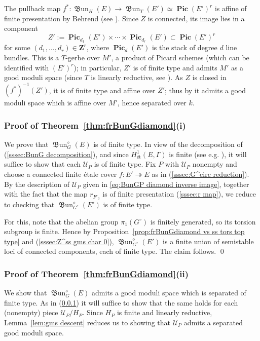 \documentclass[12pt, oneside]{amsart}
\numberwithin{equation}{section}
\theoremstyle{remark}
\theoremstyle{plain}
\newcommand{\bZ}{\mathbf{Z}}
\newcommand{\UU}{\mathcal{U}}
\newcommand{\PIC}{\operatorname{\mathbf{Pic}}}
\newcommand{\frBun}{\operatorname{\mathfrak{B}un}}
\begin{document}
The pullback map $f^*:\frBun_H(E)\to\frBun_T(E') \simeq \PIC(E')^{r}$ is affine of finite presentation by Behrend (see \cite[Lem.~3.12]{ORT}).
Since $Z$ is connected, its image lies in a component $$Z' := \PIC_{d_1}(E') \times \cdots \times \PIC_{d_r}(E') \subset \PIC(E')^{r}$$ for some $(d_1,\ldots,d_r) \in \bZ^{r}$, where $\PIC_d(E')$ is the stack of degree $d$ line bundles.
This is a $T$-gerbe over $M'$, a product of Picard schemes (which can be identified with $(E')^{r}$); in particular, $Z'$ is of finite type and admits $M'$ as a good moduli space (since $T$ is linearly reductive, see \cite[Prop.~4.7(ii)]{Alper}).
As $Z$ is closed in $(f^*)^{-1}(Z')$, it is of finite type and affine over $Z'$; thus by \cite[Lem.~4.14]{Alper} it admits a good moduli space which is affine over $M'$, hence separated over $k$.

\subsubsection{Proof of Theorem~\ref{thm:frBunGdiamond}(i)}\label{sssec:proof frBunGdiamond i}

We prove that $\frBun_G^\diamond(E)$ is of finite type.
In view of the decomposition of (\ref{sssec:BunG decomposition}), and since $H^1_{\text{\'et}}(E,\Gamma)$ is finite (see e.g. \cite[Prop.~3.1]{ORT}), it will suffice to show that each $\UU_P$ is of finite type.
Fix $P$ with $\UU_P$ nonempty and choose a connected finite \'etale cover $f : E' \twoheadrightarrow E$ as in (\ref{sssec:G^circ reduction}).
By the description of $\UU_P$ given in \eqref{eq:BunGP diamond inverse image}, together with the fact that the map $r_{F'_0}$ is of finite presentation (\ref{sssec:r map}), we reduce to checking that $\frBun_{G^\circ}^\diamond(E')$ is of finite type.

For this, note that the abelian group $\pi_1(G^\circ)$ is finitely generated, so its torsion subgroup is finite.
Hence by Proposition~\ref{prop:frBunGdiamond vs ss tors top type} and (\ref{sssec:Z^ss gms char 0}), $\frBun_{G^\circ}^\diamond(E')$ is a finite union of semistable loci of connected components, each of finite type.
The claim follows.
\qed

\subsubsection{Proof of Theorem~\ref{thm:frBunGdiamond}(ii)}\label{sssec:proof frBunGdiamond ii}

We show that $\frBun_G^\diamond(E)$ admits a good moduli space which is separated of finite type.
As in (\ref{sssec:proof frBunGdiamond i}) it will suffice to show that the same holds for each (nonempty) piece $\UU_P/H_P$.
Since $H_P$ is finite and linearly reductive, Lemma~\ref{lem:gms descent} reduces us to showing that $\UU_P$ admits a separated good moduli space.
\end{document}
